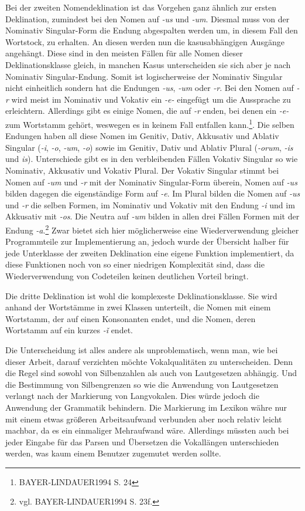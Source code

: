 \documentclass[12pt,abstract=on]{scrreprt}
\begin{document}
Bei der zweiten Nomendeklination ist das Vorgehen ganz ähnlich zur ersten Deklination, zumindest bei den Nomen auf \textit{-us} und \textit{-um}. Diesmal muss von der Nominativ Singular-Form die Endung abgespalten werden um, in diesem Fall den Wortstock, zu erhalten. An diesen werden nun die kasusabhängigen Ausgänge angehängt. Diese sind in den meisten Fällen für alle Nomen dieser Deklinationsklasse gleich, in manchen Kasus unterscheiden sie sich aber je nach Nominativ Singular-Endung. Somit ist logischerweise der Nominativ Singular nicht einheitlich sondern hat die Endungen \textit{-us}, \textit{-um} oder \textit{-r}. Bei den Nomen auf \textit{-r} wird meist im Nominativ und Vokativ ein \textit{-e-} eingefügt um die Aussprache zu erleichtern. Allerdings gibt es einige Nomen, die auf \textit{-r} enden, bei denen ein \textit{-e-} zum Wortstamm gehört, weswegen es in keinem Fall entfallen kann.\footnote{BAYER-LINDAUER1994 S. 24}. Die selben Endungen haben all diese Nomen im Genitiv, Dativ, Akkusativ und Ablativ Singular (\textit{-i}, \textit{-o}, \textit{-um}, \textit{-o}) sowie im Genitiv, Dativ und Ablativ Plural (\textit{-orum}, \textit{-is} und \textit{is}). Unterschiede gibt es in den verbleibenden Fällen Vokativ Singular so wie Nominativ, Akkusativ und Vokativ Plural. Der Vokativ Singular stimmt bei Nomen auf \textit{-um} und \textit{-r} mit der Nominativ Singular-Form überein, Nomen auf \textit{-us} bilden dagegen die eigenständige Form auf \textit{-e}. Im Plural bilden die Nomen auf \textit{-us} und \textit{-r} die selben Formen, im Nominativ und Vokativ mit den Endung \textit{-i} und im Akkusativ mit \textit{-os}. Die Neutra auf \textit{-um} bilden in allen drei Fällen Formen mit der Endung \textit{-a}.\footnote{vgl. BAYER-LINDAUER1994 S. 23f.} Zwar bietet sich hier möglicherweise eine Wiederverwendung gleicher Programmteile zur Implementierung an, jedoch wurde der Übersicht halber für jede Unterklasse der zweiten Deklination eine eigene Funktion implementiert, da diese Funktionen noch von so einer niedrigen Komplexität sind, dass die Wiederverwendung von Codeteilen keinen deutlichen Vorteil bringt. \par
Die dritte Deklination ist wohl die komplexeste Deklinationsklasse. Sie wird anhand der Wortstämme in zwei Klassen unterteilt, die Nomen mit einem Wortstamm, der auf einen Konsonanten endet, und die Nomen, deren Wortstamm auf ein kurzes \textit{-ǐ} endet. \par
Die Unterscheidung ist alles andere als unproblematisch, wenn man, wie bei dieser Arbeit, darauf verzichten möchte Vokalqualitäten zu unterscheiden. Denn die Regel sind sowohl von Silbenzahlen als auch von Lautgesetzen abhängig. Und die Bestimmung von Silbengrenzen so wie die Anwendung von Lautgesetzen verlangt nach der Markierung von Langvokalen. Dies würde jedoch die Anwendung der Grammatik behindern. Die Markierung im Lexikon währe nur mit einem etwas größeren Arbeitsaufwand verbunden aber noch relativ leicht machbar, da es ein einmaliger Mehraufwand wäre. Allerdings müssten auch bei jeder Eingabe für das Parsen und Übersetzen die Vokallängen unterschieden werden, was kaum einem Benutzer zugemutet werden sollte. \par
\end{document}
